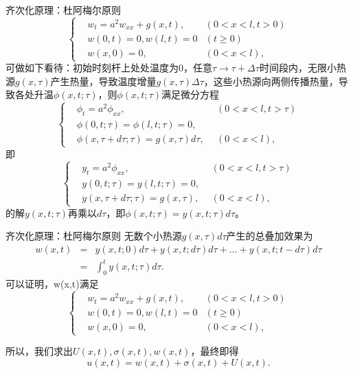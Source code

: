 \documentclass[11pt]{beamer}
\begin{document}
\begin{frame}{齐次化原理：杜阿梅尔原则}
\begin{equation}
\left\{
\begin{aligned}
& w_t = a^2 w_{xx} + g(x,t), ~~  & ( 0 < x < l, t>0) \\
& w(0,t) = 0, w(l,t) = 0 & ( t \geq 0) \\
& w(x,0) = 0, ~~ & ( 0 <x< l ),
\end{aligned}
\right.
\end{equation}
可做如下看待：初始时刻杆上处处温度为0，任意$\tau \rightarrow \tau + \Delta \tau$时间段内，无限小热源$g(x,\tau)$产生热量，导致温度增量$g(x,\tau)\Delta \tau$，这些小热源向两侧传播热量，导致各处升温$\phi(x,t;\tau)$，则$\phi(x,t;\tau)$满足微分方程
\begin{equation}
\left\{
\begin{aligned}
& \phi_t = a^2 \phi_{xx}, ~~  & ( 0 < x < l, t>\tau) \\
& \phi(0,t;\tau) = \phi(l,t;\tau) = 0, & \\
& \phi(x,\tau + d\tau; \tau) = g(x,\tau) d\tau, ~~ & ( 0 <x< l ),
\end{aligned}
\right.
\end{equation}
即
\begin{equation}
\left\{
\begin{aligned}
& y_t = a^2 \phi_{xx}, ~~  & ( 0 < x < l, t>\tau) \\
& y(0,t;\tau) = y(l,t;\tau) = 0, & \\
& y(x,\tau + d\tau; \tau) = g(x,\tau), ~~ & ( 0 <x< l ),
\end{aligned}
\right.
\end{equation}
的解$y(x,t;\tau)$再乘以$d\tau$，即$\phi(x,t;\tau) = y(x,t;\tau) d\tau$。
\end{frame}

\begin{frame}{齐次化原理：杜阿梅尔原则}
无数个小热源$g(x,\tau)d\tau$产生的总叠加效果为
\begin{eqnarray}
w(x,t) &=& y(x,t;0) d\tau + y(x,t;d\tau) d\tau  + ... + y(x,t; t-d\tau) d\tau
\nonumber\\
&=& \int^t_0 y(x,t;\tau) d\tau.
\end{eqnarray}
可以证明，w(x,t)满足
\begin{equation}
\left\{
\begin{aligned}
& w_t = a^2 w_{xx} + g(x,t), ~~  & ( 0 < x < l, t>0) \\
& w(0,t) = 0, w(l,t) = 0 & ( t \geq 0) \\
& w(x,0) = 0, ~~ & ( 0 <x< l ),
\end{aligned}
\right.
\end{equation}

所以，我们求出$U(x,t), \sigma(x,t), w(x,t)$，最终即得
\begin{equation}
u(x,t) = w(x,t) + \sigma(x,t) + U(x,t).
\end{equation}
\end{frame}
\end{document}
